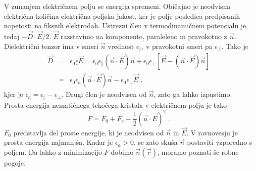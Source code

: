 V zunanjem električnem polju se energija spremeni. Običajno je neodvisna
električna količina električna poljska jakost, ker je polje posledica
predpisanih napetosti na fiksnih elektrodah. Ustrezni člen v termodinamičnem
potencialu je tedaj $-\vec{D}\cdot\vec{E}/2$. $\vec{E}$ razstavimo
na komponento, paraleleno in pravokotno z $\vec{n}$. Dielektrični
tenzor ima v smeri $\vec{n}$ vrednost $\epsilon_{\parallel}$, v
pravokotni smeri pa $\epsilon_{\perp}$. Tako je 
\begin{eqnarray}
\vec{D} & = & \epsilon_{0}\underline{\epsilon}\vec{E}=\epsilon_{0}\epsilon_{\parallel}(\vec{n}\cdot\vec{E})\vec{n}+\epsilon_{0}\epsilon_{\perp}[\vec{E}-(\vec{n}\cdot\vec{E})\vec{n}]\nonumber \\
 & = & \epsilon_{0}\epsilon_{a}(\vec{n}\cdot\vec{E})\vec{n}-\epsilon_{0}\epsilon_{\perp}\vec{E}\;,
\end{eqnarray}
 kjer je $\epsilon_{a}=\epsilon_{\parallel}-\epsilon_{\perp}$. Drugi
člen je neodvisen od $\vec{n}$, zato ga lahko izpustimo. Prosta energija
nematičnega tekočega kristala v električnem polju je tako 
\begin{equation}
F=F_{0}+F_{e}-\frac{1}{2}(\vec{n}\cdot\vec{E})^{2}\;.\label{7.72}
\end{equation}
 $F_{0}$ predstavlja del proste energije, ki je neodvisen od $\vec{n}$
in $\vec{E}$. V ravnovesju je prosta energija najmanjša. Kadar je
$\epsilon_{a}>0$, se zato skuša $\vec{n}$ postaviti vzporedno s
poljem. Da lahko z minimizacijo $F$ dobimo $\vec{n}(\vec{r})$, moramo
poznati še robne pogoje.

